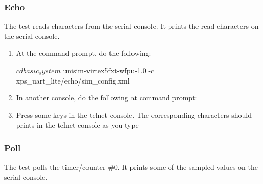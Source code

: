\cleardoublepage

\subsubsection{Echo}

The test reads characters from the serial console.
It prints the read characters on the serial console.

\begin{enumerate}
\item At the command prompt, do the following:
\begin{script}
$ cd basic_system
$ unisim-virtex5fxt-wfpu-1.0 -c xps_uart_lite/echo/sim_config.xml
\end{script}
\item In another console, do the following at command prompt:
\item Press some keys in the telnet console. The corresponding characters should prints in the telnet console as you type
\end{enumerate}

\subsubsection{Poll}

The test polls the timer/counter \#0.
It prints some of the sampled values on the serial console.

